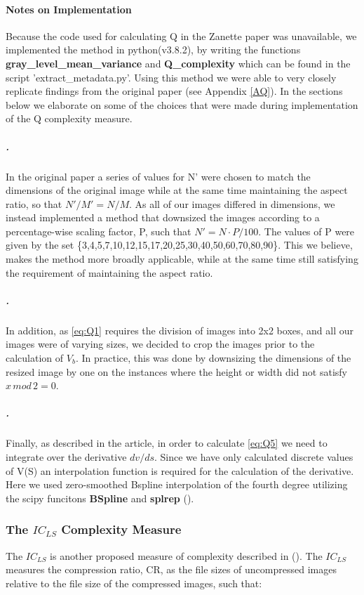 \documentclass[12pt]{article}
\begin{document}
\paragraph{Notes on Implementation}
Because the code used for calculating Q in the Zanette paper was unavailable, we implemented the method in python(v3.8.2), by writing the functions \textbf{gray\_level\_mean\_variance} and \textbf{Q\_complexity} which can be found in the script 'extract\_metadata.py'. Using this method we were able to very closely replicate findings from the original paper (see Appendix \ref{AQ}). In the sections below we elaborate on some of the choices that were made during implementation of the Q complexity measure.
\subparagraph{.}
In the original paper a series of values for N' were chosen to match the dimensions of the original image while at the same time maintaining the aspect ratio, so that $N'/M' = N/M$. As all of our images differed in dimensions, we instead implemented a method that downsized the images according to a percentage-wise scaling factor, P, such that $N' = N \cdot P/100$. The values of P were given by the set \{3,4,5,7,10,12,15,17,20,25,30,40,50,60,70,80,90\}. This we believe, makes the method more broadly applicable, while at the same time still satisfying the requirement of maintaining the aspect ratio.
\subparagraph{.}
In addition, as \ref{eq:Q1} requires the division of images into 2x2 boxes, and all our images were of varying sizes, we decided to crop the images prior to the calculation of $V_b$. In practice, this was done by downsizing the dimensions of the resized image by one on the instances where the height or width did not satisfy $x\,mod\,2 = 0$.
\subparagraph{.}
Finally, as described in the article, in order to calculate \ref{eq:Q5} we need to integrate over the derivative $dv/ds$. 
Since we have only calculated discrete values of V(S) an interpolation function is required for the calculation of the derivative. Here we used zero-smoothed Bspline interpolation of the fourth degree utilizing the scipy funcitons \textbf{BSpline} and \textbf{splrep} (\cite{virtanenSciPyFundamentalAlgorithms2020}).

\subsubsection{The $IC_{LS}$ Complexity Measure}\label{ICLS}
The $IC_{LS}$ is another proposed measure of complexity described in (\cite{yuImageComplexitySpatial2013}). 
The $IC_{LS}$ measures the compression ratio, CR, as the file sizes of uncompressed images relative to the file size of the compressed images, such that:
\end{document}
